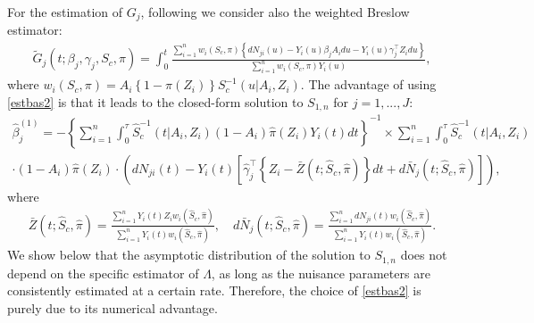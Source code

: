 \documentclass[11pt]{article}
\newcommand{\ee}{\end{eqnarray}}
\newcommand{\eqnn}{\begin{eqnarray*}}
\newcommand{\een}{\end{eqnarray*}}
\newcommand{\be}{\begin{eqnarray}}
\begin{document}
For the estimation of $G_j$, following \cite{hou2019estimating} we consider also the weighted  Breslow estimator:
\be\label{estbas2}
\tilde G_j(t; \beta_j, \gamma_j, S_c,\pi)=\int_0^t\frac{\sum_{i=1}^n w_i(S_c,\pi)\left\{dN_{ji}(u)-Y_i(u)\beta_jA_idu-Y_i(u)\gamma_j^\top Z_idu\right\}}{\sum_{i=1}^n w_i(S_c,\pi)Y_i(u)},
\ee
where
$
w_i(S_c,\pi)=A_i\left\{1-\pi(Z_i)\right\} S_c^{-1}(u | A_i,Z_i).
$
The advantage of using \eqref{estbas2} is that it leads to 
the  closed-form solution to $S_{1,n}$ for $j=1, ..., J$: 
\be\label{score1s}
\hat\beta^{(1)}_j = - 
\left\{ \sum_{i=1}^n \int_0^\tau \hat S_c^{-1}(t | A_i,Z_i)(1-A_i)\hat \pi(Z_i)Y_i(t)dt \right\}^{-1} 
\times \sum_{i=1}^n\int_0^\tau \hat S_c^{-1}(t | A_i,Z_i) \nonumber\\
\cdot(1-A_i)\hat \pi(Z_i) %
\cdot\left(dN_{ji}(t)-Y_i(t)\left[\hat \gamma_j^\top \left\{Z_i-\bar{Z}(t; \hat S_c, \hat \pi)\right\}dt+d\bar{N}_j(t; \hat S_c, \hat \pi)\right]\right),
\ee
where
\eqnn
\bar{Z}(t; \hat S_c, \hat \pi)=\frac{\sum_{i=1}^nY_i(t)Z_iw_i(\hat S_c, \hat \pi)}{\sum_{i=1}^nY_i(t)w_i(\hat S_c, \hat \pi)},\quad
d\bar{N}_j(t; \hat S_c, \hat \pi)=\frac{\sum_{i=1}^ndN_{ji}(t)w_i(\hat S_c, \hat \pi)}{\sum_{i=1}^nY_i(t)w_i(\hat S_c, \hat \pi)}.
\een
We show below that the asymptotic distribution of the solution to $S_{1,n}$ %
does not depend on the specific estimator of $\Lambda$, as long as  the nuisance parameters are consistently estimated at a certain rate. 
Therefore, the choice of \eqref{estbas2} is purely due to its numerical advantage.
\end{document}
